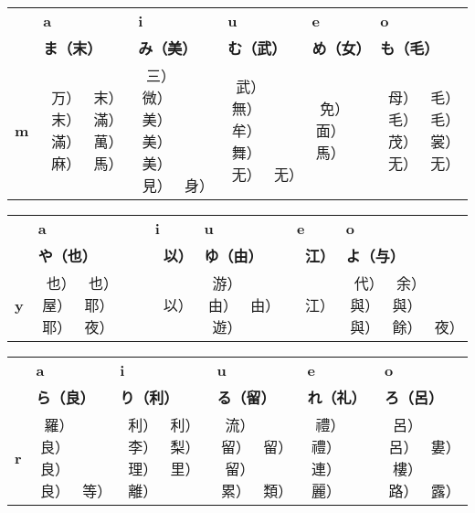\begin{center}

\begin{tabular}{m{1.0cm}||m{2.5cm}|m{2.5cm}|m{2.5cm}|m{2.5cm}|m{2.5cm}|}
& \textbf{a}& \textbf{i}& \textbf{u}& \textbf{e}& \textbf{o}\\
& \textbf{ま（末）}& \textbf{み（美）}& \textbf{む（武）}& \textbf{め（女）}& \textbf{も（毛）}\\ \hline \hline
\textbf{m}&\smallskip 𛃂（万） 𛃃（末） 𛃄（末） 𛃅（滿） 𛃆（滿） 𛃇（萬） 𛃈（麻） 𛃖（馬）
          &\smallskip 𛃉（三） 𛃊（微） 𛃋（美） 𛃌（美） 𛃍（美） 𛃎（見） 𛃏（身）
          &\smallskip 𛃐（武） 𛃑（無） 𛃒（牟） 𛃓（舞） 𛄝（无） 𛄞（无）
          &\smallskip 𛃔（免） 𛃕（面） 𛃖（馬）
          &\smallskip 𛃗（母） 𛃘（毛） 𛃙（毛） 𛃚（毛） 𛃛（茂） 𛃜（裳） 𛄝（无） 𛄞（无） \\ \hline
\end{tabular}
%

\begin{tabular}{m{1.0cm}||m{2.5cm}|m{2.5cm}|m{2.5cm}|m{2.5cm}|m{2.5cm}|}
& \textbf{a}& \textbf{i}& \textbf{u}& \textbf{e}& \textbf{o}\\
& \textbf{や（也）}& \textbf{𛀆（以）}& \textbf{ゆ（由）}& \textbf{𛀁（江）}& \textbf{よ（与）}\\ \hline \hline
\textbf{y}&\smallskip 𛃝（也） 𛃞（也） 𛃟（屋） 𛃠（耶） 𛃡（耶） 𛃢（夜）
          &\smallskip 𛀆（以）
          &\smallskip 𛃣（游） 𛃤（由） 𛃥（由） 𛃦（遊）
          &\smallskip 𛀁（江）
          &\smallskip 𛃧（代） 𛃨（余） 𛃩（與） 𛃪（與） 𛃫（與） 𛃬（餘） 𛃢（夜） \\ \hline
\end{tabular}

\begin{tabular}{m{1.0cm}||m{2.5cm}|m{2.5cm}|m{2.5cm}|m{2.5cm}|m{2.5cm}|}
& \textbf{a}& \textbf{i}& \textbf{u}& \textbf{e}& \textbf{o}\\
& \textbf{ら（良）}& \textbf{り（利）}& \textbf{る（留）}& \textbf{れ（礼）}& \textbf{ろ（呂）}\\ \hline \hline
\textbf{r}&\smallskip 𛃭（羅） 𛃮（良） 𛃯（良） 𛃰（良） 𛁽（等）
          &\smallskip 𛃱（利） 𛃲（利） 𛃳（李） 𛃴（梨） 𛃵（理） 𛃶（里） 𛃷（離）
          &\smallskip 𛃸（流） 𛃹（留） 𛃺（留） 𛃻（留） 𛃼（累） 𛃽（類）
          &\smallskip 𛃾（禮） 𛃿（禮） 𛄀（連） 𛄁（麗）
          &\smallskip 𛄂（呂） 𛄃（呂） 𛄄（婁） 𛄅（樓） 𛄆（路） 𛄇（露） \\ \hline
\end{tabular}


\end{center}
